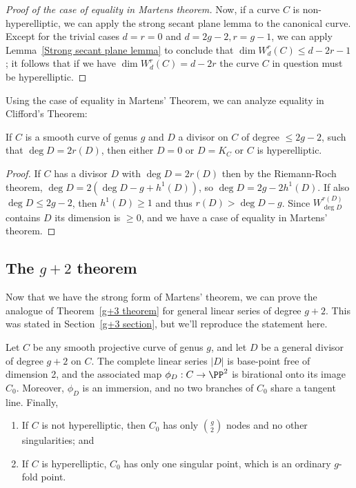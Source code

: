 \begin{proof}[Proof of the case of equality in Martens theorem]
 Now, if a curve $C$ is non-hyperelliptic, we can apply the strong secant plane lemma to the canonical curve. Except for the trivial cases $d=r=0$ and $d=2g-2, r=g-1$,
 we can apply Lemma~\ref{Strong secant plane lemma} to conclude that $\dim W^r_d(C) \leq d-2r-1$; it follows that if we have $\dim W^r_d(C) = d-2r$ the curve $C$ in question must be hyperelliptic.
\end{proof}

Using the case of equality in Martens' Theorem, we can analyze equality in 
Clifford's Theorem:

\begin{corollary}\label{equality in Clifford from Martens}
If $C$ is a smooth curve of genus $g$ and $D$ a divisor on $C$ of degree $\leq 2g-2$,
such that $\deg D = 2r(D)$, then either $D =0$ or $D=K_C$ or $C$ is hyperelliptic.
\end{corollary}

\begin{proof}
If $C$ has a divisor $D$ with $\deg D =2 r(D)$ then by the Riemann-Roch theorem,  $\deg D  = 2(\deg D-g+h^1(D))$, 
so $\deg D = 2g-2h^1(D)$. If also $\deg D\leq 2g-2$, then $h^1(D) \geq 1$
and thus $r(D) >\deg D-g$. Since $W^{r(D)}_{\deg D}$ contains $D$ its dimension
is $\geq 0$, and we have a case of equality in Martens' theorem.
\end{proof}


\subsection{The $g+2$ theorem}\label{g+2 section}

Now that we have the strong form of Martens' theorem, we can prove the analogue of Theorem~\ref{g+3 theorem} for general linear series of degree $g+2$. This was stated in Section~\ref{g+3 section}, but we'll reproduce the statement here.

\begin{theorem}\label{needed for nodes}
Let $C$ be any smooth projective curve of genus $g$, and let $D$ be a general divisor of degree $g+2$ on $C$. 
The complete linear series $|D|$ is base-point free of dimension 2, and the associated map $\phi_D: C\to \PP^2$
 is birational onto its image $C_0$. Moreover, $\phi_D$ is an immersion, and 
 no two branches of $C_0$ share a tangent line. Finally,

\begin{enumerate}
\item If $C$ is not hyperelliptic, then $C_0$ has only $\binom{g}{2}$ nodes and no other singularities; and
\item If $C$ is hyperelliptic,  $C_0$ has only one singular point, which is an ordinary $g$-fold point.\end{enumerate}
\end{theorem}

